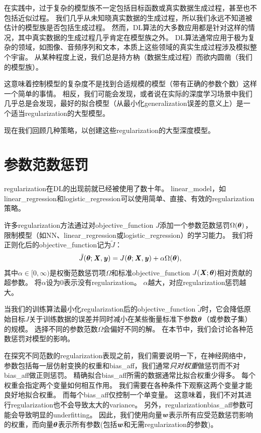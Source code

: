 在实践中，过于复杂的模型族不一定包括目标函数或真实数据生成过程，甚至也不包括近似过程。
我们几乎从未知晓真实数据的生成过程，所以我们永远不知道被估计的模型族是否包括生成过程。
然而，\gls{DL}算法的大多数应用都是针对这样的情况，其中真实数据的生成过程几乎肯定在模型族之外。
\gls{DL}算法通常应用于极为复杂的领域，如图像、音频序列和文本，本质上这些领域的真实生成过程涉及模拟整个宇宙。
从某种程度上说，我们总是持方枘（数据生成过程）而欲内圆凿（我们的模型族）。

这意味着控制模型的复杂度不是找到合适规模的模型（带有正确的参数个数）这样一个简单的事情。
相反，我们可能会发现，或者说在实际的深度学习场景中我们几乎总是会发现，最好的拟合模型（从最小化\gls{generalization}误差的意义上）是一个适当\gls{regularization}的大型模型。

现在我们回顾几种策略，以创建这些\gls{regularization}的大型深度模型。


\section{参数范数惩罚}
\label{sec:parameter_norm_penalties}
\gls{regularization}在\gls{DL}的出现前就已经被使用了数十年。
\gls{linear_model}，如\gls{linear_regression}和\gls{logistic_regression}可以使用简单、直接、有效的\gls{regularization}策略。

许多\gls{regularization}方法通过对\gls{objective_function} $J$添加一个参数范数惩罚$\Omega(\boldsymbol{\theta})$，限制模型（如\gls{NN}、\gls{linear_regression}或\gls{logistic_regression}）的学习能力。
我们将正则化后的\gls{objective_function}记为$\tilde{J}$：
\begin{align}
 \tilde{J}(\boldsymbol{\theta};\boldsymbol{\mathit{X}}, \boldsymbol{\mathit{y}}) = J(\boldsymbol{\theta};\boldsymbol{\mathit{X}}, \boldsymbol{\mathit{y}}) + \alpha \Omega(\boldsymbol{\theta}),
\end{align}
其中$\alpha \in [0, \infty)$是权衡范数惩罚项$\Omega$和标准\gls{objective_function} $J(\boldsymbol{\mathit{X}};\boldsymbol{\theta})$相对贡献的超参数。
将$\alpha$设为0表示没有\gls{regularization}。
$\alpha$越大，对应\gls{regularization}惩罚越大。

当我们的训练算法最小化\gls{regularization}后的\gls{objective_function} $\tilde{J}$时，它会降低原始目标$J$关于训练数据的误差并同时减小在某些衡量标准下参数$\boldsymbol{\theta}$（或参数子集）的规模。
选择不同的参数范数$\Omega$会偏好不同的解。
在本节中，我们会讨论各种范数惩罚对模型的影响。

在探究不同范数的\gls{regularization}表现之前，我们需要说明一下，在神经网络中，参数包括每一层仿射变换的权重和\gls{bias_aff}，我们通常\emph{只对权重}做惩罚而不对\gls{bias_aff}做正则惩罚。
精确拟合\gls{bias_aff}所需的数据通常比拟合权重少得多。
每个权重会指定两个变量如何相互作用。
我们需要在各种条件下观察这两个变量才能良好地拟合权重。
而每个\gls{bias_aff}仅控制一个单变量。
这意味着，我们不对其进行\gls{regularization}也不会导致太大的\gls{variance}。
另外，\gls{regularization}\gls{bias_aff}参数可能会导致明显的\gls{underfitting}。
因此，我们使用向量$\boldsymbol{\mathit{w}}$表示所有应受范数惩罚影响的权重，而向量$\boldsymbol{\theta}$表示所有参数(包括$\boldsymbol{\mathit{w}}$和无需\gls{regularization}的参数)。

